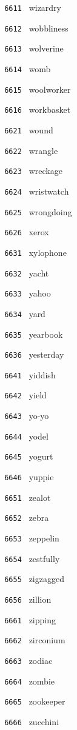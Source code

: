 \documentclass[11pt]{article}
\begin{document}
\begin{multicols}{6}
\noindent \texttt{ 6611 } wizardry  \par
\noindent \texttt{ 6612 } wobbliness  \par
\noindent \texttt{ 6613 } wolverine  \par
\noindent \texttt{ 6614 } womb  \par
\noindent \texttt{ 6615 } woolworker  \par
\noindent \texttt{ 6616 } workbasket  \par
\vspace{3mm}
\noindent \texttt{ 6621 } wound  \par
\noindent \texttt{ 6622 } wrangle  \par
\noindent \texttt{ 6623 } wreckage  \par
\noindent \texttt{ 6624 } wristwatch  \par
\noindent \texttt{ 6625 } wrongdoing  \par
\noindent \texttt{ 6626 } xerox  \par
\vspace{3mm}
\noindent \texttt{ 6631 } xylophone  \par
\noindent \texttt{ 6632 } yacht  \par
\noindent \texttt{ 6633 } yahoo  \par
\noindent \texttt{ 6634 } yard  \par
\noindent \texttt{ 6635 } yearbook  \par
\noindent \texttt{ 6636 } yesterday  \par
\vspace{3mm}
\noindent \texttt{ 6641 } yiddish  \par
\noindent \texttt{ 6642 } yield  \par
\noindent \texttt{ 6643 } yo-yo  \par
\noindent \texttt{ 6644 } yodel  \par
\noindent \texttt{ 6645 } yogurt  \par
\noindent \texttt{ 6646 } yuppie  \par
\vspace{3mm}
\noindent \texttt{ 6651 } zealot  \par
\noindent \texttt{ 6652 } zebra  \par
\noindent \texttt{ 6653 } zeppelin  \par
\noindent \texttt{ 6654 } zestfully  \par
\noindent \texttt{ 6655 } zigzagged  \par
\noindent \texttt{ 6656 } zillion  \par
\vspace{3mm}
\noindent \texttt{ 6661 } zipping  \par
\noindent \texttt{ 6662 } zirconium  \par
\noindent \texttt{ 6663 } zodiac  \par
\noindent \texttt{ 6664 } zombie  \par
\noindent \texttt{ 6665 } zookeeper  \par
\noindent \texttt{ 6666 } zucchini
\end{multicols}
\end{document}
